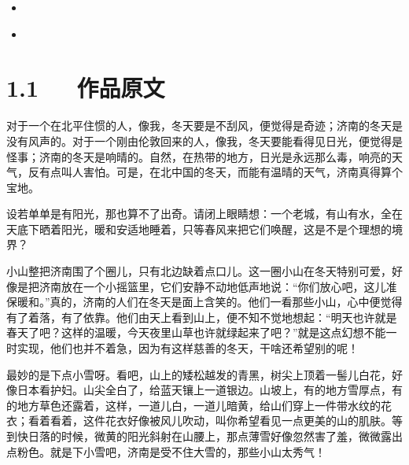 \documentclass[letterpaper,12pt,english]{sphinxmanual}
\begin{document}
\begin{sphinxShadowBox}
\begin{itemize}
\begin{itemize}
\begin{itemize}
\item {} 
\label{\detokenize{p01_u6563_u6587/_u8001_u820d-_u6d4e_u5357_u7684_u51ac_u5929:id18}}{\hyperref[\detokenize{p01_u6563_u6587/_u8001_u820d-_u6d4e_u5357_u7684_u51ac_u5929:id9}]{}}

\item {} 
\label{\detokenize{p01_u6563_u6587/_u8001_u820d-_u6d4e_u5357_u7684_u51ac_u5929:id19}}{\hyperref[\detokenize{p01_u6563_u6587/_u8001_u820d-_u6d4e_u5357_u7684_u51ac_u5929:id10}]{}}

\end{itemize}

\end{itemize}

\end{itemize}
\end{sphinxShadowBox}


\section{1.1   作品原文}
\label{\detokenize{p01_u6563_u6587/_u8001_u820d-_u6d4e_u5357_u7684_u51ac_u5929:id3}}
对于一个在北平住惯的人，像我，冬天要是不刮风，便觉得是奇迹；济南的冬天是没有风声的。对于一个刚由伦敦回来的人，像我，冬天要能看得见日光，便觉得是怪事；济南的冬天是响晴的。自然，在热带的地方，日光是永远那么毒，响亮的天气，反有点叫人害怕。可是，在北中国的冬天，而能有温晴的天气，济南真得算个宝地。

设若单单是有阳光，那也算不了出奇。请闭上眼睛想：一个老城，有山有水，全在天底下晒着阳光，暖和安适地睡着，只等春风来把它们唤醒，这是不是个理想的境界？

小山整把济南围了个圈儿，只有北边缺着点口儿。这一圈小山在冬天特别可爱，好像是把济南放在一个小摇篮里，它们安静不动地低声地说：“你们放心吧，这儿准保暖和。”真的，济南的人们在冬天是面上含笑的。他们一看那些小山，心中便觉得有了着落，有了依靠。他们由天上看到山上，便不知不觉地想起：“明天也许就是春天了吧？这样的温暖，今天夜里山草也许就绿起来了吧？”就是这点幻想不能一时实现，他们也并不着急，因为有这样慈善的冬天，干啥还希望别的呢！

最妙的是下点小雪呀。看吧，山上的矮松越发的青黑，树尖上顶着一髻儿白花，好像日本看护妇。山尖全白了，给蓝天镶上一道银边。山坡上，有的地方雪厚点，有的地方草色还露着，这样，一道儿白，一道儿暗黄，给山们穿上一件带水纹的花衣；看着看着，这件花衣好像被风儿吹动，叫你希望看见一点更美的山的肌肤。等到快日落的时候，微黄的阳光斜射在山腰上，那点薄雪好像忽然害了羞，微微露出点粉色。就是下小雪吧，济南是受不住大雪的，那些小山太秀气！
\end{document}
